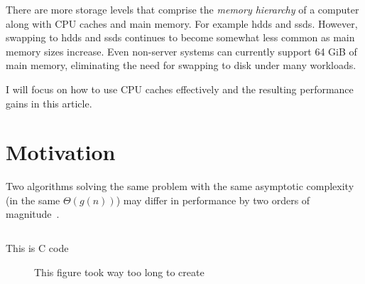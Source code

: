 \documentclass[a4paper]{scrartcl}
\newcommand{\article}{article} %
\begin{document}
There are more storage levels that comprise
the \emph{memory hierarchy} of a computer along with CPU caches and main memory.  For
example \glspl{hdd} and \glspl{ssd}. %
However, swapping to \glspl{hdd} and \glspl{ssd} continues to become somewhat less common
as main memory sizes increase.  Even non-server systems can currently support 64 GiB of
main memory, eliminating the need for swapping to disk under many workloads.

I will focus on how to use CPU caches effectively and the resulting
performance gains in this \article{}.

\section{Motivation} %

Two algorithms solving the same problem with the same asymptotic complexity (in the same
\(\Theta(g(n))\)) may differ in performance by two orders of magnitude~\cite[p.~2]{afmh}.



\begin{listing}
   \inputminted[firstline=3]{c}{array-sum/array-sum.c}
   \caption{This is C code}
   \label{lst:array-sum}
\end{listing}


\begin{figure}
   \centering
   \caption{This figure took way too long to create}
   \label{fig:array-sum}
\end{figure}
\end{document}
